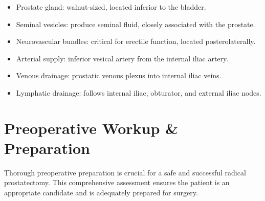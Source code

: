 \begin{itemize}
  \item Prostate gland: walnut-sized, located inferior to the bladder.
  \item Seminal vesicles: produce seminal fluid, closely associated with the prostate.
  \item Neurovascular bundles: critical for erectile function, located posterolaterally.
  \item Arterial supply: inferior vesical artery from the internal iliac artery.
  \item Venous drainage: prostatic venous plexus into internal iliac veins.
  \item Lymphatic drainage: follows internal iliac, obturator, and external iliac nodes.
\end{itemize}

\section*{Preoperative Workup \& Preparation}
Thorough preoperative preparation is crucial for a safe and successful radical prostatectomy. This comprehensive assessment ensures the patient is an appropriate candidate and is adequately prepared for surgery.

